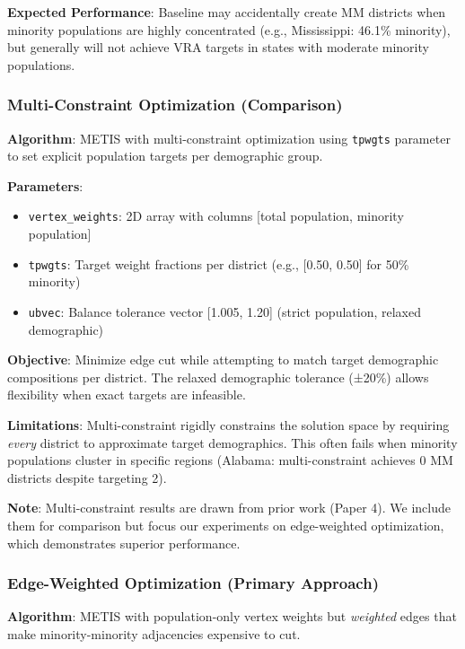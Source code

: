 \textbf{Expected Performance}: Baseline may accidentally create MM districts when minority populations are highly concentrated (e.g., Mississippi: 46.1\% minority), but generally will not achieve VRA targets in states with moderate minority populations.

\subsubsection{Multi-Constraint Optimization (Comparison)}

\textbf{Algorithm}: METIS with multi-constraint optimization using \texttt{tpwgts} parameter to set explicit population targets per demographic group.

\textbf{Parameters}:
\begin{itemize}
    \item \texttt{vertex\_weights}: 2D array with columns [total population, minority population]
    \item \texttt{tpwgts}: Target weight fractions per district (e.g., [0.50, 0.50] for 50\% minority)
    \item \texttt{ubvec}: Balance tolerance vector [1.005, 1.20] (strict population, relaxed demographic)
\end{itemize}

\textbf{Objective}: Minimize edge cut while attempting to match target demographic compositions per district. The relaxed demographic tolerance (±20\%) allows flexibility when exact targets are infeasible.

\textbf{Limitations}: Multi-constraint rigidly constrains the solution space by requiring \emph{every} district to approximate target demographics. This often fails when minority populations cluster in specific regions (Alabama: multi-constraint achieves 0 MM districts despite targeting 2).

\textbf{Note}: Multi-constraint results are drawn from prior work (Paper 4). We include them for comparison but focus our experiments on edge-weighted optimization, which demonstrates superior performance.

\subsubsection{Edge-Weighted Optimization (Primary Approach)}

\textbf{Algorithm}: METIS with population-only vertex weights but \emph{weighted} edges that make minority-minority adjacencies expensive to cut.

